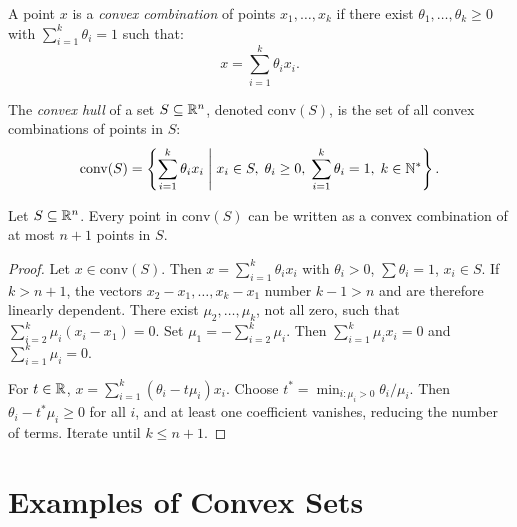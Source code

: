 \begin{definition}
A point $x$ is a \emph{convex combination} of points $x_1, \ldots, x_k$ if there
exist $\theta_1, \ldots, \theta_k \geq 0$ with $\sum_{i=1}^k \theta_i = 1$ such that:
\[
    x = \sum_{i=1}^k \theta_i x_i.
\]
\end{definition}

\begin{definition}
The \emph{convex hull} of a set $S \subseteq \mathbb{R}^n$, denoted $\mathrm{conv}(S)$,
is the set of all convex combinations of points in $S$:
\[
    \mathrm{conv}(S) = \left\{ \sum_{i=1}^k \theta_i x_i \;\middle|\;
    x_i \in S, \; \theta_i \geq 0, \; \sum_{i=1}^k \theta_i = 1, \; k \in \mathbb{N}^* \right\}.
\]
\end{definition}

\begin{theorem}
\label{thm:caratheodory}
Let $S \subseteq \mathbb{R}^n$. Every point in $\mathrm{conv}(S)$ can be written as a convex
combination of at most $n+1$ points in $S$.
\end{theorem}

\begin{proof}
Let $x \in \mathrm{conv}(S)$. Then $x = \sum_{i=1}^k \theta_i x_i$ with
$\theta_i > 0$, $\sum \theta_i = 1$, $x_i \in S$. If $k > n+1$, the vectors
$x_2 - x_1, \ldots, x_k - x_1$ number $k-1 > n$ and are therefore linearly
dependent. There exist $\mu_2, \ldots, \mu_k$, not all zero, such that
$\sum_{i=2}^k \mu_i (x_i - x_1) = 0$. Set $\mu_1 = -\sum_{i=2}^k \mu_i$.
Then $\sum_{i=1}^k \mu_i x_i = 0$ and $\sum_{i=1}^k \mu_i = 0$.

For $t \in \mathbb{R}$, $x = \sum_{i=1}^k (\theta_i - t\mu_i)x_i$. Choose
$t^* = \min_{i:\mu_i>0} \theta_i/\mu_i$. Then $\theta_i - t^*\mu_i \geq 0$
for all $i$, and at least one coefficient vanishes, reducing the number of terms.
Iterate until $k \leq n+1$.
\end{proof}

\section{Examples of Convex Sets}

